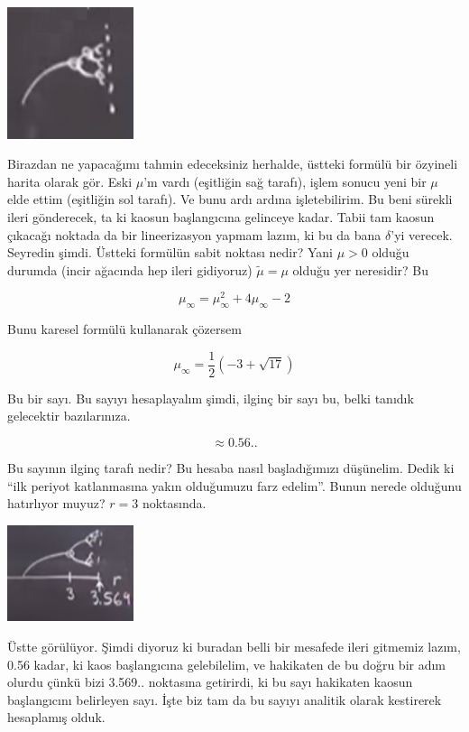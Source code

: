 \documentclass[12pt,fleqn]{article}\usepackage{../../common}
\begin{document}
\includegraphics[width=10em]{22_12.png}

Birazdan ne yapacağımı tahmin edeceksiniz herhalde, üstteki formülü bir özyineli
harita olarak gör. Eski $\mu$'m vardı (eşitliğin sağ tarafı), işlem sonucu yeni
bir $\mu$ elde ettim (eşitliğin sol tarafı). Ve bunu ardı ardına
işletebilirim. Bu beni sürekli ileri gönderecek, ta ki kaosun başlangıcına
gelinceye kadar. Tabii tam kaosun çıkacağı noktada da bir lineerizasyon yapmam
lazım, ki bu da bana $\delta$'yi verecek. Seyredin şimdi. Üstteki formülün sabit
noktası nedir? Yani $\mu>0$ olduğu durumda (incir ağacında hep ileri gidiyoruz)
$\tilde{\mu} = \mu$ olduğu yer neresidir? Bu

$$ \mu_\infty = \mu_\infty^2 + 4 \mu_\infty - 2$$

Bunu karesel formülü kullanarak çözersem

$$ \mu_\infty = \frac{1}{2} \left( -3 + \sqrt{17} \right)$$

Bu bir sayı. Bu sayıyı hesaplayalım şimdi, ilginç bir sayı bu, belki tanıdık
gelecektir bazılarınıza.

$$  \approx 0.56.. $$

Bu sayının ilginç tarafı nedir? Bu hesaba nasıl başladığımızı düşünelim. Dedik
ki ``ilk periyot katlanmasına yakın olduğumuzu farz edelim''. Bunun nerede
olduğunu hatırlıyor muyuz? $r=3$ noktasında.

\includegraphics[width=10em]{22_13.png}

Üstte görülüyor. Şimdi diyoruz ki buradan belli bir mesafede ileri gitmemiz
lazım, 0.56 kadar, ki kaos başlangıcına gelebilelim, ve hakikaten de bu doğru
bir adım olurdu çünkü bizi 3.569.. noktasına getirirdi, ki bu sayı hakikaten
kaosun başlangıcını belirleyen sayı. İşte biz tam da bu sayıyı analitik olarak
kestirerek hesaplamış olduk.
\end{document}
